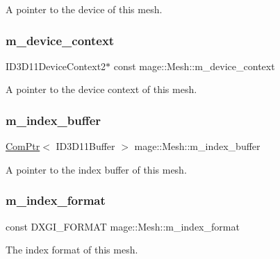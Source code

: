 A pointer to the device of this mesh. \hypertarget{classmage_1_1_mesh_a1d19b5bceea2256f4d80ebc06fa74f00}{}\label{classmage_1_1_mesh_a1d19b5bceea2256f4d80ebc06fa74f00} 
\subsubsection{\texorpdfstring{m\+\_\+device\+\_\+context}{m\_device\_context}}
{\footnotesize\ttfamily I\+D3\+D11\+Device\+Context2$\ast$ const mage\+::\+Mesh\+::m\+\_\+device\+\_\+context\hspace{0.3cm}{\ttfamily [protected]}}

A pointer to the device context of this mesh. \hypertarget{classmage_1_1_mesh_abe29363ebac77b284ca69532fd5b3373}{}\label{classmage_1_1_mesh_abe29363ebac77b284ca69532fd5b3373} 
\subsubsection{\texorpdfstring{m\+\_\+index\+\_\+buffer}{m\_index\_buffer}}
{\footnotesize\ttfamily \hyperlink{namespacemage_ae74f374780900893caa5555d1031fd79}{Com\+Ptr}$<$ I\+D3\+D11\+Buffer $>$ mage\+::\+Mesh\+::m\+\_\+index\+\_\+buffer\hspace{0.3cm}{\ttfamily [protected]}}

A pointer to the index buffer of this mesh. \hypertarget{classmage_1_1_mesh_a93dbb92d756948df3b08fc29426c6acf}{}\label{classmage_1_1_mesh_a93dbb92d756948df3b08fc29426c6acf} 
\subsubsection{\texorpdfstring{m\+\_\+index\+\_\+format}{m\_index\_format}}
{\footnotesize\ttfamily const D\+X\+G\+I\+\_\+\+F\+O\+R\+M\+AT mage\+::\+Mesh\+::m\+\_\+index\+\_\+format\hspace{0.3cm}{\ttfamily [private]}}

The index format of this mesh. \hypertarget{classmage_1_1_mesh_a5e3baa9e2b2e9b4ce795a456f76d87b2}{}\label{classmage_1_1_mesh_a5e3baa9e2b2e9b4ce795a456f76d87b2} 
